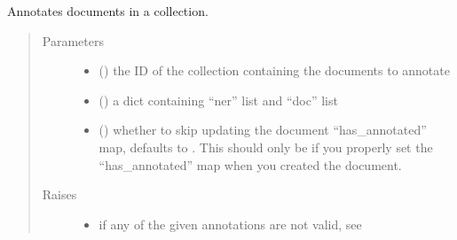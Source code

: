 \documentclass[letterpaper,10pt,english]{sphinxmanual}
\begin{document}
\begin{fulllineitems}
\begin{fulllineitems}
\label{\detokenize{autoapi/pine/client/index:pine.client.PineClient.annotate_collection_documents}}
Annotates documents in a collection.
\begin{quote}\begin{description}
\item[{Parameters}] \leavevmode\begin{itemize}
\item {} 
 () \textendash{} the ID of the collection containing the documents to annotate

\item {} 
 () \textendash{} a dict containing “ner” list and “doc” list

\item {} 
 () \textendash{} whether to skip updating the document “has\_annotated” map, defaults to .
This should only be  if you properly set the
“has\_annotated” map when you created the document.

\end{itemize}

\item[{Raises}] \leavevmode\begin{itemize}
\item {} 
{\hyperref[\detokenize{autoapi/pine/client/exceptions/index:pine.client.exceptions.PineClientValueException}]{}} \textendash{} if any of the given annotations are not valid, see {\hyperref[\detokenize{autoapi/pine/client/models/index:pine.client.models.is_valid_doc_annotations}]{}}


\end{itemize}
\end{description}
\end{quote}
\end{fulllineitems}
\end{fulllineitems}
\end{document}
